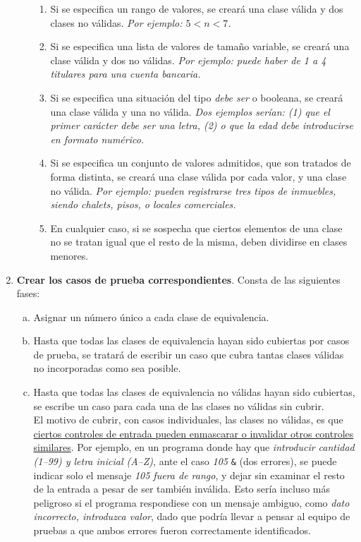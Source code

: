 \begin{enumerate}
\begin{enumerate}[a.]
        \begin{enumerate}[R1.]
            \item Si se especifica un rango de valores, se creará una clase válida y dos clases no válidas. \textit{Por ejemplo: $5<n<7$.}
            \item Si se especifica una lista de valores de tamaño variable, se creará una clase válida y dos no válidas. \textit{Por ejemplo: puede haber de 1 a 4 titulares para una cuenta bancaria.}
            \item Si se especifica una situación del tipo \textit{debe ser} o booleana, se creará una clase válida y una no válida. \textit{Dos ejemplos serían: (1) que el primer carácter debe ser una letra, (2) o que la edad debe introducirse en formato numérico.}
            \item Si se especifica un conjunto de valores admitidos, que son tratados de forma distinta, se creará una clase válida por cada valor, y una clase no válida. \textit{Por ejemplo: pueden registrarse tres tipos de inmuebles, siendo chalets, pisos, o locales comerciales.}
            \item En cualquier caso, si se sospecha que ciertos elementos de una clase no se tratan igual que el resto de la misma, deben dividirse en clases menores.
        \end{enumerate}
    \end{enumerate}

    \item \textbf{Crear los casos de prueba correspondientes}. Consta de las siguientes fases:
    
    \begin{enumerate}[a.]
        \item Asignar un número único a cada clase de equivalencia.
        \item Hasta que todas las clases de equivalencia hayan sido cubiertas por casos de prueba, se tratará de escribir un caso que cubra tantas clases válidas no incorporadas como sea posible.
        \item Hasta que todas las clases de equivalencia no válidas hayan sido cubiertas, se escribe un caso para cada una de las clases no válidas sin cubrir.\\
        
        El motivo de cubrir, con casos individuales, las clases no válidas, es que \uline{ciertos controles de entrada pueden enmascarar o invalidar otros controles similares}. Por ejemplo, en un programa donde hay que \textit{introducir cantidad (1--99) y letra inicial (A--Z)}, ante el caso \textit{105} \texttt{\&} (dos errores), se puede indicar solo el mensaje \textit{105 fuera de rango}, y dejar sin examinar el resto de la entrada a pesar de ser también inválida. Esto sería incluso más peligroso si el programa respondiese con un mensaje ambiguo, como \textit{dato incorrecto, introduzca valor}, dado que podría llevar a pensar al equipo de pruebas a que ambos errores fueron correctamente identificados.
    \end{enumerate}
\end{enumerate}

